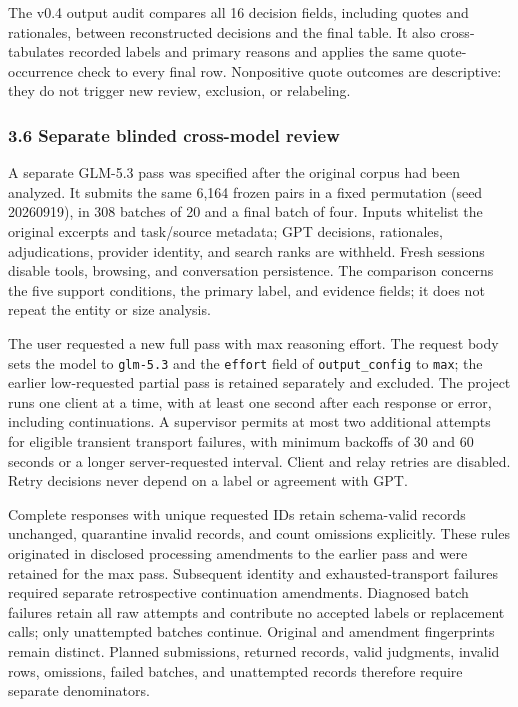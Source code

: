 \documentclass[10pt]{article}
\begin{document}
The v0.4 output audit compares all 16 decision fields, including quotes and rationales, between reconstructed decisions and the final table. It also cross-tabulates recorded labels and primary reasons and applies the same quote-occurrence check to every final row. Nonpositive quote outcomes are descriptive: they do not trigger new review, exclusion, or relabeling.

\hypertarget{separate-blinded-cross-model-review}{%
\subsubsection{3.6 Separate blinded cross-model review}\label{separate-blinded-cross-model-review}}

A separate GLM-5.3 pass was specified after the original corpus had been analyzed. It submits the same 6,164 frozen pairs in a fixed permutation (seed 20260919), in 308 batches of 20 and a final batch of four. Inputs whitelist the original excerpts and task/source metadata; GPT decisions, rationales, adjudications, provider identity, and search ranks are withheld. Fresh sessions disable tools, browsing, and conversation persistence. The comparison concerns the five support conditions, the primary label, and evidence fields; it does not repeat the entity or size analysis.

The user requested a new full pass with max reasoning effort. The request body sets the model to \texttt{glm-5.3} and the \texttt{effort} field of \texttt{output\_config} to \texttt{max}; the earlier low-requested partial pass is retained separately and excluded. The project runs one client at a time, with at least one second after each response or error, including continuations. A supervisor permits at most two additional attempts for eligible transient transport failures, with minimum backoffs of 30 and 60 seconds or a longer server-requested interval. Client and relay retries are disabled. Retry decisions never depend on a label or agreement with GPT.

Complete responses with unique requested IDs retain schema-valid records unchanged, quarantine invalid records, and count omissions explicitly. These rules originated in disclosed processing amendments to the earlier pass and were retained for the max pass. Subsequent identity and exhausted-transport failures required separate retrospective continuation amendments. Diagnosed batch failures retain all raw attempts and contribute no accepted labels or replacement calls; only unattempted batches continue. Original and amendment fingerprints remain distinct. Planned submissions, returned records, valid judgments, invalid rows, omissions, failed batches, and unattempted records therefore require separate denominators.
\end{document}
